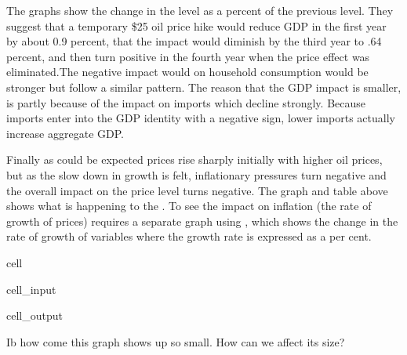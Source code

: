 \documentclass[letterpaper,10pt,english]{jupyterBook}
\begin{document}
\sphinxAtStartPar
The graphs show the change in the level as a percent of the previous level. They suggest that a temporary \$25 oil price hike would reduce GDP in the first year by about 0.9 percent, that the impact would diminish by the third year to \sphinxhyphen{}.64 percent, and then turn positive in the fourth year when the price effect was eliminated.The negative impact would on household consumption would be stronger but follow a similar pattern.  The reason that the GDP impact is smaller, is partly because of the impact on imports which decline strongly.  Because imports enter into the GDP identity with a negative sign, lower imports actually increase aggregate GDP.

\sphinxAtStartPar
Finally as could be expected prices rise sharply initially with higher oil prices, but as the slow down in growth is felt, inflationary pressures turn negative and the overall impact on the price level turns negative.  The graph and table above shows what is happening to the . To see the impact on inflation (the rate of growth of prices) requires a separate graph using , which shows the change in the rate of growth of variables where the growth rate is expressed as a per cent.

\begin{sphinxuseclass}{cell}\begin{sphinxVerbatimInput}

\begin{sphinxuseclass}{cell_input}
\begin{sphinxVerbatim}[commandchars=\\\{\}]
\PYG{p}{[}\PYG{p}{]}
\end{sphinxVerbatim}

\end{sphinxuseclass}\end{sphinxVerbatimInput}
\begin{sphinxVerbatimOutput}

\begin{sphinxuseclass}{cell_output}
\noindent{}

\end{sphinxuseclass}\end{sphinxVerbatimOutput}

\end{sphinxuseclass}
\sphinxAtStartPar
 Ib how come this graph shows up so small.  How can we affect its size?
\end{document}
